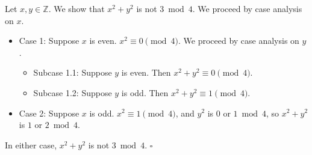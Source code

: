 Let $x, y \in \mathbb{Z}$.
We show that $x^{2} + y^{2}$ is not $3 \bmod 4$.
We proceed by case analysis on $x$.

\begin{itemize}
  \item Case 1: Suppose $x$ is even.
    $x^{2} \equiv 0 \pmod{4}$.
    We proceed by case analysis on $y$.
    \begin{itemize}
      \item Subcase 1.1: Suppose $y$ is even.
        Then $x^{2} + y^{2} \equiv 0 \pmod{4}$.
      \item Subcase 1.2: Suppose $y$ is odd.
        Then $x^{2} + y^{2} \equiv 1 \pmod{4}$.
    \end{itemize}
  \item Case 2: Suppose $x$ is odd.
    $x^{2} \equiv 1 \pmod{4}$, and $y^{2}$ is $0$ or $1 \bmod 4$, so $x^{2} + y^{2}$ is $1$ or $2 \bmod 4$.
\end{itemize}

In either case, $x^{2} + y^{2}$ is not $3 \bmod 4$. \hfill$\square$